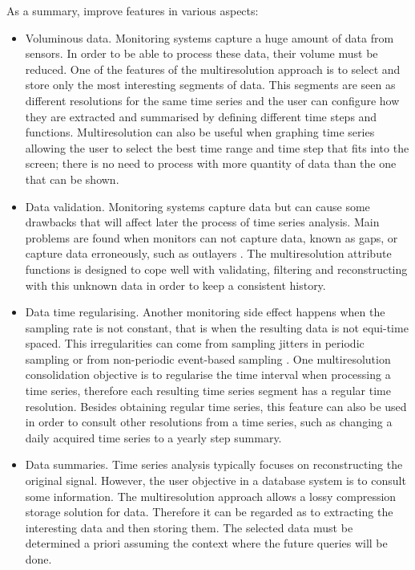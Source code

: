 As a summary,  improve  features in various aspects:
\begin{itemize}

\item Voluminous data. Monitoring systems capture a huge amount of
  data from sensors. In order to be able to process these data,
  their volume must be reduced. One of the features of the
  multiresolution approach is to select and store only the most
  interesting segments of data. This segments are seen as different
  resolutions for the same time series and the user can configure how
  they are extracted and summarised by defining different time steps
  and functions. Multiresolution can also be useful when graphing time
  series allowing the user to select the best time range and time
  step that fits into the screen; there is no need to process with
  more quantity of data than the one that can be
  shown.

\item Data validation. Monitoring systems capture data but can cause
  some drawbacks that will affect later the process of time series
  analysis. Main problems are found when monitors can not capture
  data, known as gaps, or capture data erroneously, such as outlayers
  \cite{quevedo10}.  The multiresolution attribute functions is
  designed to cope well with validating, filtering and reconstructing
  with this unknown data in order to keep a consistent
  history.

\item Data time regularising. Another monitoring side effect happens
  when the sampling rate is not constant, that is when the resulting
  data is not equi-time spaced. This irregularities can come from
  sampling jitters in periodic sampling or from non-periodic
  event-based sampling \cite{kopetz11:realtime}. One multiresolution
  consolidation objective is to regularise the time interval when
  processing a time series, therefore each resulting time series
  segment has a regular time resolution. Besides obtaining regular
  time series, this feature can also be used in order to consult other
  resolutions from a time series, such as changing a daily acquired
  time series to a yearly step summary.


\item Data summaries. Time series analysis typically focuses on
  reconstructing the original signal. However, the user objective in a
  database system is to consult some information. The multiresolution
  approach allows a lossy compression storage solution for data. Therefore
  it can be regarded as to extracting the interesting data and
  then storing them. The selected data must be determined a
  priori assuming the context where the future queries will be done.
\end{itemize}


